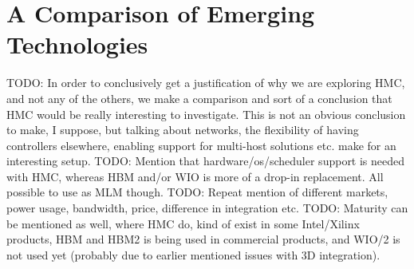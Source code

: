 \section{A Comparison of Emerging Technologies}
TODO: In order to conclusively get a justification of why we are exploring HMC, and not any of the others, we make a comparison and sort of a conclusion that HMC would be really interesting to investigate. This is not an obvious conclusion to make, I suppose, but talking about networks, the flexibility of having controllers elsewhere, enabling support for multi-host solutions etc. make for an interesting setup. 
TODO: Mention that hardware/os/scheduler support is needed with HMC, whereas HBM and/or WIO is more of a drop-in replacement. All possible to use as MLM though.
TODO: Repeat mention of different markets, power usage, bandwidth, price, difference in integration etc. 
TODO: Maturity can be mentioned as well, where HMC do, kind of exist in some Intel/Xilinx products, HBM and HBM2 is being used in commercial products, and WIO/2 is not used yet (probably due to earlier mentioned issues with 3D integration).